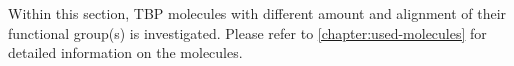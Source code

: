 Within this section, TBP molecules with different amount and alignment of their functional group(s) is investigated. Please refer to \autoref{chapter:used-molecules} for detailed information on the molecules.

